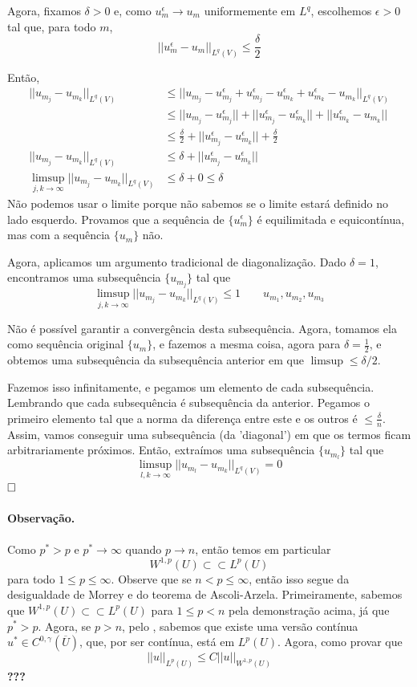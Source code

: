 \documentclass[11pt]{article}
\newcommand{\qed}{$\hfill\square$}
\newcommand{\e}{\epsilon}
\begin{document}
Agora, fixamos $\delta > 0$ e, como $u_m^\e \rightarrow u_m$ uniformemente em $L^q$, escolhemos $\e>0$ tal que, para todo $m$, \[ ||u_m^\e - u_m||_{L^q(V)} \leq \frac{\delta}{2} \]

Então, \begin{align*}
	|| u_{m_j} - u_{m_k} ||_{L^q(V)} &\leq || u_{m_j} - u_{m_j}^\e + u_{m_j}^\e -u_{m_k}^\e + u_{m_k}^\e -u_{m_k} ||_{L^q(V)} \\
	&\leq || u_{m_j} - u_{m_j}^\e || + || u_{m_j}^\e -u_{m_k}^\e || + || u_{m_k}^\e -u_{m_k} || \\
	&\leq \frac{\delta}{2} + || u_{m_j}^\e -u_{m_k}^\e || + \frac{\delta}{2} \\
	|| u_{m_j} - u_{m_k} ||_{L^q(V)} &\leq \delta + || u_{m_j}^\e -u_{m_k}^\e || \\
	\limsup_{j,k\rightarrow\infty} || u_{m_j} - u_{m_k} ||_{L^q(V)} &\leq \delta + 0 \leq \delta
\end{align*}
Não podemos usar o limite porque não sabemos se o limite estará definido no lado esquerdo. Provamos que a sequência de $\{u_m^\e\}$ é equilimitada e equicontínua, mas com a sequência $\{u_m\}$ não.

Agora, aplicamos um argumento tradicional de diagonalização. Dado $\delta=1$, encontramos uma subsequência $\{u_{m_j}\}$ tal que \[\limsup_{j,k\rightarrow\infty} || u_{m_j} - u_{m_k} ||_{L^q(V)} \leq 1 \qquad u_{m_1}, u_{m_2}, u_{m_3}\]

Não é possível garantir a convergência desta subsequência. Agora, tomamos ela como sequência original $\{u_m\}$, e fazemos a mesma coisa, agora para $\delta=\frac{1}{2}$, e obtemos uma subsequência da subsequência anterior em que $\limsup \leq \delta/2$.

Fazemos isso infinitamente, e pegamos um elemento de cada subsequência. Lembrando que cada subsequência é subsequência da anterior. Pegamos o primeiro elemento tal que a norma da diferença entre este e os outros é $\leq \frac{\delta}{n}$. Assim, vamos conseguir uma subsequência (da 'diagonal') em que os termos ficam arbitrariamente próximos. Então, extraímos uma subsequência $\{u_{m_l}\}$ tal que \[ \limsup_{l,k\rightarrow\infty} ||u_{m_l} - u_{m_k}||_{L^q(V)} =0  \] 
\qed

\paragraph{Observação.} Como $p^*>p$ e $p^* \rightarrow \infty$ quando $p\rightarrow n$, então temos em particular \[W^{1,p}(U) \subset\subset L^p(U)\] para todo $1\leq p \leq \infty $. Observe que se $n < p \leq \infty$, então isso segue da desigualdade de Morrey e do teorema de Ascoli-Arzela. Primeiramente, sabemos que $W^{1,p}(U) \subset\subset L^p(U)$ para $1\leq p < n$ pela demonstração acima, já que $p^*>p$. Agora, se $p>n$, pelo , sabemos que existe uma versão contínua $u^* \in C^{0, \gamma}(\overline{U})$, que, por ser contínua, está em $L^p(U)$. Agora, como provar que \[ ||u||_{L^p(U)} \leq C ||u||_{W^{1,p}(U)} \] \textbf{???}
\end{document}
